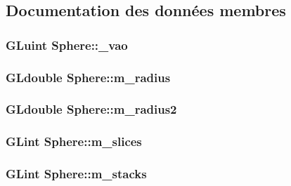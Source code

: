 \subsection{Documentation des données membres}
\hypertarget{class_sphere_a18d31b1d011d5c5e452b9b9b6f54b10f}{
\subsubsection[{\+\_\+vao}]{\setlength{\rightskip}{0pt plus 5cm}G\+Luint Sphere\+::\+\_\+vao\hspace{0.3cm}{\ttfamily [private]}}}\label{class_sphere_a18d31b1d011d5c5e452b9b9b6f54b10f}
\hypertarget{class_sphere_a4b019bb4bf74ac28ab56d5ae2c9ca6ea}{
\subsubsection[{m\+\_\+radius}]{\setlength{\rightskip}{0pt plus 5cm}G\+Ldouble Sphere\+::m\+\_\+radius\hspace{0.3cm}{\ttfamily [private]}}}\label{class_sphere_a4b019bb4bf74ac28ab56d5ae2c9ca6ea}
\hypertarget{class_sphere_aa3ec1c07df539131c0fb886fe9c619fd}{
\subsubsection[{m\+\_\+radius2}]{\setlength{\rightskip}{0pt plus 5cm}G\+Ldouble Sphere\+::m\+\_\+radius2\hspace{0.3cm}{\ttfamily [private]}}}\label{class_sphere_aa3ec1c07df539131c0fb886fe9c619fd}
\hypertarget{class_sphere_a6ddad99936fa616fa04862aa92e20105}{
\subsubsection[{m\+\_\+slices}]{\setlength{\rightskip}{0pt plus 5cm}G\+Lint Sphere\+::m\+\_\+slices\hspace{0.3cm}{\ttfamily [private]}}}\label{class_sphere_a6ddad99936fa616fa04862aa92e20105}
\hypertarget{class_sphere_aef79b7beb9d008e8dcc0849fbe691072}{
\subsubsection[{m\+\_\+stacks}]{\setlength{\rightskip}{0pt plus 5cm}G\+Lint Sphere\+::m\+\_\+stacks\hspace{0.3cm}{\ttfamily [private]}}}\label{class_sphere_aef79b7beb9d008e8dcc0849fbe691072}
